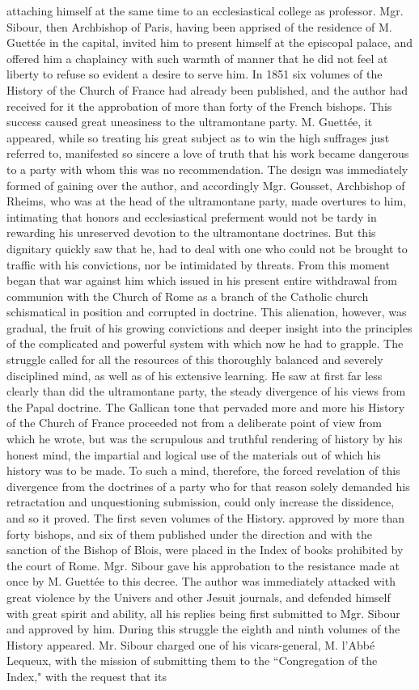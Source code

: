 attaching himself at the same time to an ecclesiastical college as professor. Mgr. Sibour, then Archbishop of Paris, having been apprised of the residence of M. Guettée in the capital, invited him to present himself at the episcopal palace, and offered him a chaplaincy with such warmth of manner that he did not feel at liberty to refuse so evident a desire to serve him. In 1851 six volumes of the History of the Church of France had already been published, and the author had received for it the approbation of more than forty of the French bishops. This success caused great uneasiness to the ultramontane party. M. Guettée, it appeared, while so treating his great subject as to win the high suffrages just referred to, manifested so sincere a love of truth that his work became dangerous to a party with whom this was no recommendation. The design was immediately formed of gaining over the author, and accordingly Mgr. Gousset, Archbishop of Rheims, who was at the head of the ultramontane party, made overtures to him, intimating that honors and ecclesiastical preferment would not be tardy in rewarding his unreserved devotion to the ultramontane doctrines. But this dignitary quickly saw that he, had to deal with one who could not be brought to traffic with his convictions, nor be intimidated by threats. From this moment began that war against him which issued in his present entire withdrawal from communion with the Church of Rome as a branch of the Catholic church schismatical in position and corrupted in doctrine. This alienation, however, was gradual, the fruit of his growing convictions and deeper insight into the principles of the complicated and powerful system with which now he had to grapple. The struggle called for all the resources of this thoroughly balanced and severely disciplined mind, as well as of his extensive learning. He saw at first far less clearly than did the ultramontane party, the steady divergence of his views from the Papal doctrine. The Gallican tone that pervaded more and more his History of the Church of France proceeded not from a deliberate point of view from which he wrote, but was the scrupulous and truthful rendering of history by his honest mind, the impartial and logical use of the materials out of which his history was to be made. To such a mind, therefore, the forced revelation of this divergence from the doctrines of a party who for that reason solely demanded his retractation and unquestioning submission, could only increase the dissidence, and so it proved. The first seven volumes of the History. approved by more than forty bishops, and six of them published under the direction and with the sanction of the Bishop of Blois, were placed in the Index of books prohibited by the court of Rome. Mgr. Sibour gave his approbation to the resistance made at once by M. Guettée to this decree. The author was immediately attacked with great violence by the Univers and other Jesuit journals, and defended himself with great spirit and ability, all his replies being first submitted to Mgr. Sibour and approved by him. During this struggle the eighth and ninth volumes of the History appeared. Mr. Sibour charged one of his vicars-general, M. l'Abbé Lequeux, with the mission of submitting them to the “Congregation of the Index," with the request that its 